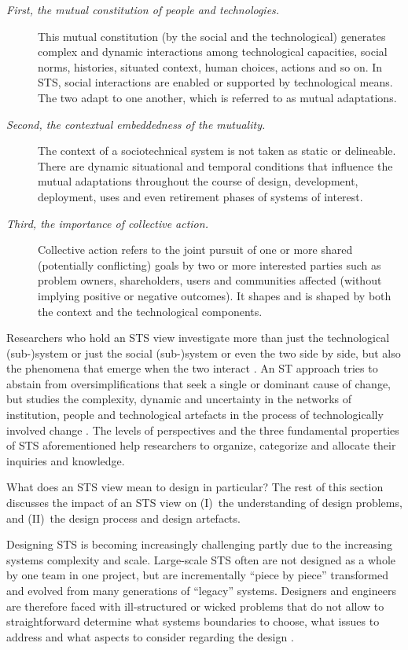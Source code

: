 \begin{description}
\item[\textit{First, the mutual constitution of people and technologies.}] 
This mutual constitution (by the social and the technological) generates complex and dynamic interactions among technological capacities, social norms, histories, situated context, human choices, actions and so on. In STS, social interactions are enabled or supported by technological means. The two adapt to one another, which is referred to as mutual adaptations. 
%
\item[\textit{Second, the contextual embeddedness of the mutuality.}] 
The context of a sociotechnical system is not taken as static or delineable. There are dynamic situational and temporal conditions that influence 
the mutual adaptations throughout the course of design, development, deployment, uses and even retirement phases of systems of interest. 
%
\item[\textit{Third, the importance of collective action.}] 
Collective action refers to the joint pursuit of one or more shared (potentially conflicting) goals by two or more interested parties such as problem owners, shareholders, users  and communities affected (without implying positive or negative outcomes). It shapes and is shaped by both the context and the technological components. 
\end{description}
%
%
Researchers who hold an STS view investigate more than just the technological (sub-)system or just the social (sub-)system or even the two side by side, but also the phenomena that emerge when the two interact \cite{Lee2001}. An ST approach tries to abstain from oversimplifications that seek a single or dominant cause of change, but studies the complexity, dynamic and uncertainty in the networks of institution, people and technological artefacts in the process of technologically involved change \cite{Sawyer2014}. 
%
The levels of perspectives and the three fundamental properties of STS aforementioned help researchers to organize, categorize and allocate their inquiries and knowledge. 

What does an STS view mean to design in particular? The rest of this section discusses the impact of an STS view on (I)~the understanding of design problems, and (II)~the design process and design artefacts.

 Designing STS is becoming increasingly challenging partly due to the increasing systems complexity and scale.  
Large-scale STS often are not designed as a whole by one team in one project, but are incrementally ``piece by piece'' transformed and evolved from many generations of ``legacy'' systems. Designers and engineers are therefore faced with ill-structured or wicked problems that do not allow to straightforward determine what systems boundaries to choose, what issues to address and what aspects to consider regarding the design \cite{Bots2007}. 

